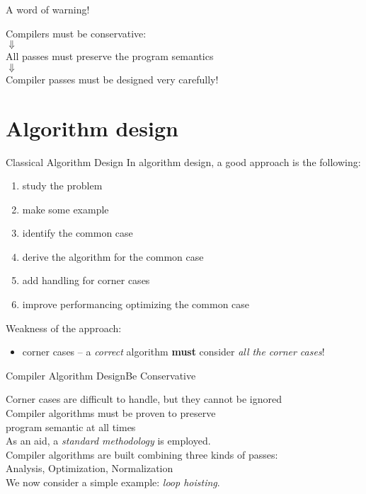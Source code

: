 \documentclass[10pt,mathserif]{beamer}
\begin{document}
\begin{frame}{A word of warning!}
\begin{center}
{\large 
Compilers must be \alert{conservative}:\\
\smallskip
$\Downarrow$\\
\smallskip
All passes \alert{must preserve the program semantics}\\
\smallskip
$\Downarrow$\\
\smallskip
Compiler passes must be designed \alert{very carefully}!\\
}
\end{center}
\end{frame}


\section{Algorithm design}
\begin{frame}{Classical Algorithm Design}
In algorithm design, a good approach is the following:
\begin{enumerate}
\item study the problem
\item make some example
\item identify the \alert{common case}
\item derive the algorithm for the common case
\item add handling for \alert{corner cases}
\item improve performancing \alert{optimizing the common case}
\end{enumerate}

\vfill
Weakness of the approach:
\begin{itemize}
\item \alert{corner cases} -- a \emph{correct} algorithm \textbf{must} consider \emph{all the corner cases}!
\end{itemize}
\end{frame}


\begin{frame}{Compiler Algorithm Design}{Be Conservative}
\begin{center}
Corner cases are difficult to handle, but they cannot be ignored\\
\smallskip
{\small Compiler algorithms must be \alert{proven} to preserve\\
program semantic \alert{at all times}}\\
\bigskip
As an aid, a \emph{standard methodology} is employed.\\
\bigskip
Compiler algorithms are built combining \alert{three} kinds of passes:\\
\medskip
Analysis, Optimization, Normalization\\
\bigskip
\pause
We now consider a simple example: \emph{loop hoisting}.
\end{center}
\end{frame}
\end{document}
